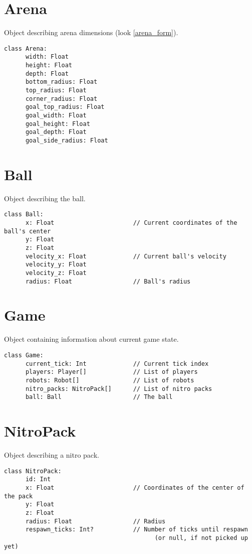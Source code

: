 \section{Arena}

Object describing arena dimensions (look \ref{arena_form}).

\begin{verbatim}
class Arena:
      width: Float
      height: Float
      depth: Float
      bottom_radius: Float
      top_radius: Float
      corner_radius: Float
      goal_top_radius: Float
      goal_width: Float
      goal_height: Float
      goal_depth: Float
      goal_side_radius: Float
\end{verbatim}

\section{Ball}

Object describing the ball.

\begin{verbatim}
class Ball:
      x: Float                      // Current coordinates of the ball's center
      y: Float
      z: Float
      velocity_x: Float             // Current ball's velocity
      velocity_y: Float
      velocity_z: Float
      radius: Float                 // Ball's radius
\end{verbatim}

\section{Game}

Object containing information about current game state.

\begin{verbatim}
class Game:
      current_tick: Int             // Current tick index
      players: Player[]             // List of players
      robots: Robot[]               // List of robots
      nitro_packs: NitroPack[]      // List of nitro packs
      ball: Ball                    // The ball
\end{verbatim}

\section{NitroPack}

Object describing a nitro pack.

\begin{verbatim}
class NitroPack:
      id: Int
      x: Float                      // Coordinates of the center of the pack
      y: Float
      z: Float
      radius: Float                 // Radius
      respawn_ticks: Int?           // Number of ticks until respawn
                                          (or null, if not picked up yet)
\end{verbatim}

